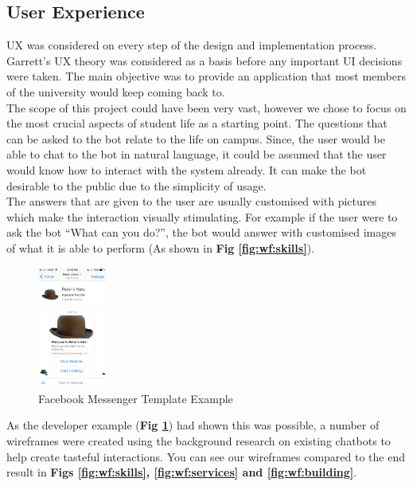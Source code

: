 \documentclass[journal, a4paper]{IEEEtran}
\begin{document}
\subsection{User Experience}
UX was considered on every step of the design and implementation process. Garrett's UX \cite{garrett} theory was considered as a basis before any important UI decisions were taken. The main objective was to provide an application that most members of the university would keep coming back to.\\

The scope of this project could have been very vast, however we chose to focus on the most crucial aspects of student life as a starting point. The questions that can be asked to the bot relate to the life on campus. Since, the user would be able to chat to the bot in natural language, it could be assumed that the user would know how to interact with the system already. It can make the bot desirable to the public due to the simplicity of usage.\\

The answers that are given to the user are usually customised with pictures which make the interaction visually stimulating. For example if the user were to ask the bot ``What can you do?'', the bot would answer with customised images of what it is able to perform (As shown in \textbf{Fig \ref{fig:wf:skills}}).\\

\begin{figure}
	\centering
    \includegraphics[width=0.2\textwidth]{images/example}
	\caption{Facebook Messenger Template Example}
    \label{fig:3:messenger_template}
\end{figure}

As the developer example (\textbf{Fig \ref{fig:3:messenger_template}}) had shown this was possible, a number of wireframes were created using the background research on existing chatbots to help create tasteful interactions. You can see our wireframes compared to the end result in \textbf{Figs \ref{fig:wf:skills}, \ref{fig:wf:services} and \ref{fig:wf:building}}.
\end{document}
